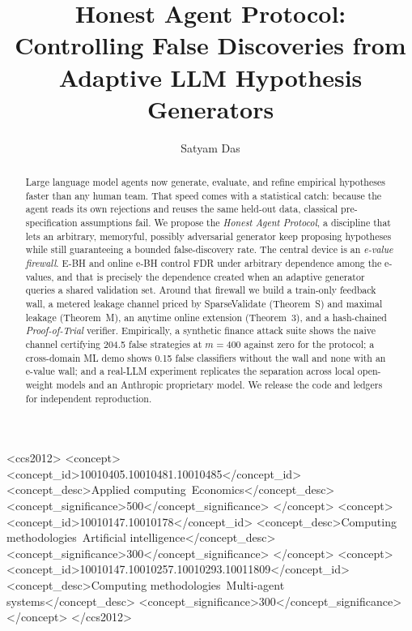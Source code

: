 \documentclass[sigconf]{acmart}
\theoremstyle{plain}
\begin{document}
\title{Honest Agent Protocol: Controlling False Discoveries from Adaptive
  LLM Hypothesis Generators}

\author{Satyam Das}

\begin{abstract}
Large language model agents now generate, evaluate, and refine empirical
hypotheses faster than any human team. That speed comes with a statistical
catch: because the agent reads its own rejections and reuses the same held-out
data, classical pre-specification assumptions fail. We propose the
\emph{Honest Agent Protocol}, a discipline that lets an arbitrary, memoryful,
possibly adversarial generator keep proposing hypotheses while still
guaranteeing a bounded false-discovery rate. The central device is an
\emph{e-value firewall}. E-BH and online e-BH control FDR under arbitrary
dependence among the e-values, and that is precisely the dependence created
when an adaptive generator queries a shared validation set. Around that firewall
we build a train-only feedback wall, a metered leakage channel priced by
SparseValidate (Theorem~S) and maximal leakage (Theorem~M), an anytime online
extension (Theorem~3), and a hash-chained \emph{Proof-of-Trial} verifier.
Empirically, a synthetic finance attack suite shows the naive channel
certifying 204.5 false strategies at $m=400$ against zero for the protocol; a
cross-domain ML demo shows 0.15 false classifiers without the wall and none
with an e-value wall; and a real-LLM experiment replicates the separation
across local open-weight models and an Anthropic proprietary model. We release
the code and ledgers for independent reproduction.
\end{abstract}

\begin{CCSXML}
<ccs2012>
 <concept>
  <concept_id>10010405.10010481.10010485</concept_id>
  <concept_desc>Applied computing~Economics</concept_desc>
  <concept_significance>500</concept_significance>
 </concept>
 <concept>
  <concept_id>10010147.10010178</concept_id>
  <concept_desc>Computing methodologies~Artificial intelligence</concept_desc>
  <concept_significance>300</concept_significance>
 </concept>
 <concept>
  <concept_id>10010147.10010257.10010293.10011809</concept_id>
  <concept_desc>Computing methodologies~Multi-agent systems</concept_desc>
  <concept_significance>300</concept_significance>
 </concept>
</ccs2012>
\end{CCSXML}
\end{document}
